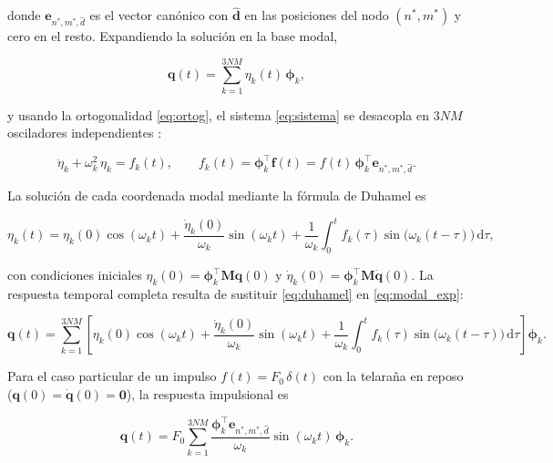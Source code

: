 \documentclass[11pt,letterpaper]{article}
\begin{document}
donde $\mathbf{e}_{n^*,m^*,\hat{d}}$ es el vector canónico con
$\hat{\mathbf{d}}$ en las posiciones del nodo $(n^*,m^*)$ y cero en el
resto. Expandiendo la solución en la base modal,

\begin{equation}\label{eq:modal_exp}
    \mathbf{q}(t) = \sum_{k=1}^{3NM}\eta_k(t)\,\boldsymbol{\phi}_k,
\end{equation}

y usando la ortogonalidad \eqref{eq:ortog}, el sistema \eqref{eq:sistema}
se desacopla en $3NM$ osciladores independientes \cite{inman2014,meirovitch2001}:

\begin{equation}\label{eq:eta_k}
    \ddot{\eta}_k + \omega_k^2\,\eta_k = f_k(t),
    \qquad
    f_k(t) = \boldsymbol{\phi}_k^\top\mathbf{f}(t)
            = f(t)\,\boldsymbol{\phi}_k^\top\mathbf{e}_{n^*,m^*,\hat{d}}.
\end{equation}

La solución de cada coordenada modal mediante la fórmula de Duhamel es

\begin{equation}\label{eq:duhamel}
    \eta_k(t)
    = \eta_k(0)\cos(\omega_k t)
    + \frac{\dot{\eta}_k(0)}{\omega_k}\sin(\omega_k t)
    + \frac{1}{\omega_k}
      \int_0^t f_k(\tau)\sin\!\bigl(\omega_k(t-\tau)\bigr)\,\mathrm{d}\tau,
\end{equation}

con condiciones iniciales $\eta_k(0) = \boldsymbol{\phi}_k^\top
\mathbf{M}\mathbf{q}(0)$ y $\dot{\eta}_k(0) = \boldsymbol{\phi}_k^\top
\mathbf{M}\dot{\mathbf{q}}(0)$. La respuesta temporal completa resulta
de sustituir \eqref{eq:duhamel} en \eqref{eq:modal_exp}:

\begin{equation}\label{eq:resp_completa}
    \mathbf{q}(t)
    = \sum_{k=1}^{3NM}
      \left[
          \eta_k(0)\cos(\omega_k t)
          + \frac{\dot{\eta}_k(0)}{\omega_k}\sin(\omega_k t)
          + \frac{1}{\omega_k}
            \int_0^t f_k(\tau)
            \sin\!\bigl(\omega_k(t-\tau)\bigr)\,\mathrm{d}\tau
      \right]\boldsymbol{\phi}_k.
\end{equation}

Para el caso particular de un impulso $f(t)=F_0\,\delta(t)$ con la
telaraña en reposo ($\mathbf{q}(0)=\dot{\mathbf{q}}(0)=\mathbf{0}$),
la respuesta impulsional es

\begin{equation}\label{eq:impulsional}
    \mathbf{q}(t)
    = F_0\sum_{k=1}^{3NM}
      \frac{\boldsymbol{\phi}_k^\top\mathbf{e}_{n^*,m^*,\hat{d}}}{\omega_k}
      \sin(\omega_k t)\,\boldsymbol{\phi}_k.
\end{equation}
\end{document}
